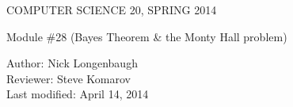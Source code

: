 \documentclass[12pt]{article}
\begin{document}
\begin{center}
COMPUTER SCIENCE 20, SPRING 2014 \\
\smallskip

Module \#28 (Bayes Theorem \& the Monty Hall problem)
\end{center}
Author: Nick Longenbaugh\\
Reviewer: Steve Komarov\\
Last modified: April 14, 2014 

\end{document}

